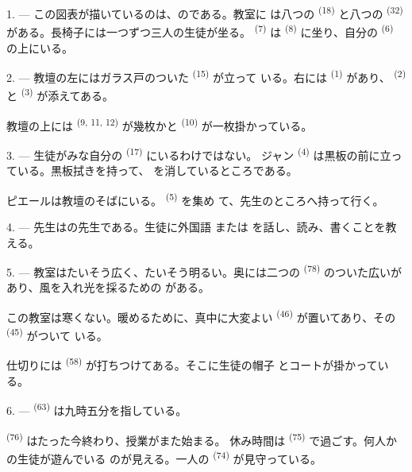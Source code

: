 \VUsaut{3.0mm}

1. --- この図表が描いているのは、のである。教室に
は八つの \textsuperscript{(18)} と八つの
\textsuperscript{(32)} がある。長椅子には一つずつ三人の生徒が坐る。
 \textsuperscript{(7)} は \textsuperscript{(8)} に坐り、自分の
 \textsuperscript{(6)} の上にいる。

2. --- 教壇の左にはガラス戸のついた \textsuperscript{(15)} が立って
いる。右には \textsuperscript{(1)} があり、
\textsuperscript{(2)} と \textsuperscript{(3)} が添えてある。

教壇の上には \textsuperscript{(9, 11, 12)} が幾枚かと
\textsuperscript{(10)} が一枚掛かっている。

3. --- 生徒がみな自分の \textsuperscript{(17)} にいるわけではない。
ジャン \textsuperscript{(4)} は黒板の前に立っている。黒板拭きを持って、
を消しているところである。

ピエールは教壇のそばにいる。 \textsuperscript{(5)} を集め
て、先生のところへ持って行く。

4. --- 先生はの先生である。生徒に外国語
または
を話し、読み、書くことを教える。

5. --- 教室はたいそう広く、たいそう明るい。奥には二つの
\textsuperscript{(78)} のついた広いがあり、風を入れ光を採るための
がある。

この教室は寒くない。暖めるために、真中に大変よい
\textsuperscript{(46)} が置いてあり、その \textsuperscript{(45)} がついて
いる。

仕切りには \textsuperscript{(58)} が打ちつけてある。そこに生徒の帽子
とコートが掛かっている。

\VUsaut{5.2mm}
\VUsaut{3.6mm}

6. ---  \textsuperscript{(63)} は九時五分を指している。

 \textsuperscript{(76)} はたった今終わり、授業がまた始まる。
休み時間は \textsuperscript{(75)} で過ごす。何人かの生徒が遊んでいる
のが見える。一人の \textsuperscript{(74)} が見守っている。

